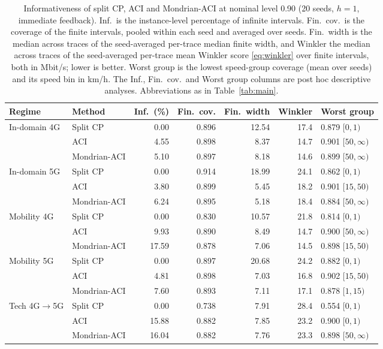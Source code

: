 \begin{table}[!t]
\caption{Informativeness of split CP, ACI and Mondrian-ACI at nominal level 0.90 (20 seeds, $h=1$, immediate feedback). Inf.\ is the instance-level percentage of infinite intervals. Fin.\ cov.\ is the coverage of the finite intervals, pooled within each seed and averaged over seeds. Fin.\ width is the median across traces of the seed-averaged per-trace median finite width, and Winkler the median across traces of the seed-averaged per-trace mean Winkler score \eqref{eq:winkler} over finite intervals, both in Mbit/s; lower is better. Worst group is the lowest speed-group coverage (mean over seeds) and its speed bin in km/h. The Inf., Fin.\ cov.\ and Worst group columns are post hoc descriptive analyses. Abbreviations as in Table~\ref{tab:main}.}
\label{tab:inform}
\centering
\footnotesize
\begin{tabular}{llrrrrl}
\toprule
Regime & Method & Inf.\ (\%) & Fin.\ cov. & Fin.\ width & Winkler & Worst group \\
\midrule
In-domain 4G & Split CP & 0.00 & 0.896 & 12.54 & 17.4 & 0.879 $[0,1)$ \\
 & ACI & 4.55 & 0.898 & 8.37 & 14.7 & 0.901 $[50,\infty)$ \\
 & Mondrian-ACI & 5.10 & 0.897 & 8.18 & 14.6 & 0.899 $[50,\infty)$ \\
\midrule
In-domain 5G & Split CP & 0.00 & 0.914 & 18.99 & 24.1 & 0.862 $[0,1)$ \\
 & ACI & 3.80 & 0.899 & 5.45 & 18.2 & 0.901 $[15,50)$ \\
 & Mondrian-ACI & 6.24 & 0.895 & 5.18 & 18.4 & 0.884 $[50,\infty)$ \\
\midrule
Mobility 4G & Split CP & 0.00 & 0.830 & 10.57 & 21.8 & 0.814 $[0,1)$ \\
 & ACI & 9.93 & 0.890 & 8.49 & 14.7 & 0.900 $[50,\infty)$ \\
 & Mondrian-ACI & 17.59 & 0.878 & 7.06 & 14.5 & 0.898 $[15,50)$ \\
\midrule
Mobility 5G & Split CP & 0.00 & 0.897 & 20.68 & 24.2 & 0.882 $[0,1)$ \\
 & ACI & 4.81 & 0.898 & 7.03 & 16.8 & 0.902 $[15,50)$ \\
 & Mondrian-ACI & 7.60 & 0.893 & 7.11 & 17.1 & 0.878 $[1,15)$ \\
\midrule
Tech 4G$\rightarrow$5G & Split CP & 0.00 & 0.738 & 7.91 & 28.4 & 0.554 $[0,1)$ \\
 & ACI & 15.88 & 0.882 & 7.85 & 23.2 & 0.900 $[0,1)$ \\
 & Mondrian-ACI & 16.04 & 0.882 & 7.76 & 23.3 & 0.898 $[50,\infty)$ \\

\end{tabular}
\end{table}
